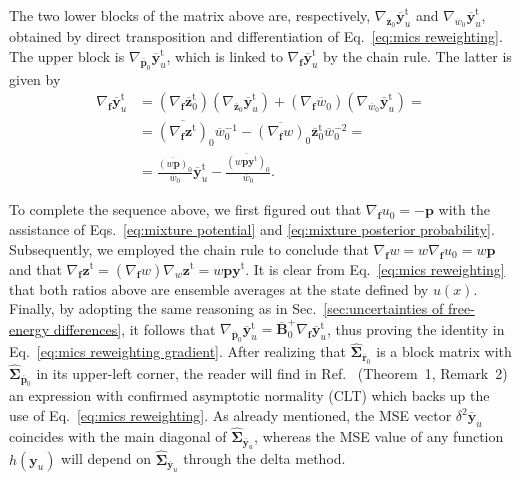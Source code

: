 \documentclass[journal=jctcce,manuscript=article]{achemso}
\newcommand{\mt}[1]{\boldsymbol{\mathbf{#1}}}   %
\newcommand{\vt}[1]{\boldsymbol{\mathbf{#1}}}   %
\newcommand{\tr}[1]{#1^\text{t}}                %
\newcommand{\avg}[1]{\overline{#1}}             %
\begin{document}
The two lower blocks of the matrix above are, respectively, $\nabla_{\avg{\vt z}_0} \tr{\avg{\vt y}}_u$ and $\nabla_{\avg{w}_0} \tr{\avg{\vt y}}_u$, obtained by direct transposition and differentiation of Eq.~\eqref{eq:mics reweighting}. The upper block is $\nabla_{\avg{\vt p}_0} \tr{\avg{\vt y}}_u$, which is linked to $\nabla_{\vt f} \tr{\avg{\vt y}}_u$ by the chain rule. The latter is given by
\begin{equation*}
\begin{split}
\nabla_{\vt f} \tr{\avg{\vt y}}_u &= (\nabla_{\vt f} \tr{\avg{\vt z}}_0) (\nabla_{\avg{\vt z}_0} \tr{\avg{\vt y}}_u) + (\nabla_{\vt f} {\avg{w}_0}) (\nabla_{\avg{w}_0} \tr{\avg{\vt y}}_u) = \\
&= {{\avg{(\nabla_{\vt f} \tr{\vt z})}_0}}{\avg{w}_0^{-1}} - {\avg{(\nabla_{\vt f} w)}_0} \tr{\avg{\vt z}}_0  {\avg{w}_0^{-2}} = \\
&= \frac{\avg{(w {\vt p})}_0}{\avg{w}_0} \tr{\avg{\vt y}}_u - \frac{\avg{(w{\vt p}\tr{\vt y})}_0}{\avg{w}_0}.
\end{split}
\end{equation*}

To complete the sequence above, we first figured out that $\nabla_{\vt f} u_0 = -{\vt p}$ with the assistance of Eqs.~\eqref{eq:mixture potential} and \eqref{eq:mixture posterior probability}. Subsequently, we employed the chain rule to conclude that $\nabla_{\vt f} w = w \nabla_{\vt f} u_0 = w \vt p$ and that $\nabla_{\vt f} \tr{\vt z} = (\nabla_{\vt f} w) \nabla_w \tr{\vt z} = w \vt p \tr{\vt y}$. It is clear from Eq.~\eqref{eq:mics reweighting} that both ratios above are ensemble averages at the state defined by $u(x)$. Finally, by adopting the same reasoning as in Sec.~\ref{sec:uncertainties of free-energy differences}, it follows that $\nabla_{\avg{\vt p}_0} \tr{\avg{\vt y}}_u = \avg{\mt B}_0^+ \nabla_{\vt f} \tr{\avg{\vt y}}_u$, thus proving the identity in Eq.~\eqref{eq:mics reweighting gradient}. After realizing that $\hat{\mt \Sigma}_{\avg{\vt r}_0}$ is a block matrix with $\hat{\mt \Sigma}_{\avg{\vt p}_0}$ in its upper-left corner, the reader will find in Ref.~ (Theorem~1, Remark~2) an expression with confirmed asymptotic normality (CLT) which backs up the use of Eq.~\eqref{eq:mics reweighting}. As already mentioned, the MSE vector $\delta^2 \avg{\vt y}_u$ coincides with the main diagonal of $\hat{\mt \Sigma}_{\avg{\vt y}_u}$, whereas the MSE value of any function $h(\vt y_u)$ will depend on $\hat{\mt \Sigma}_{\avg{\vt y}_u}$ through the delta method.
\end{document}
